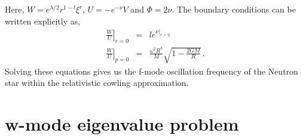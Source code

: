 Here, $W = e^{\lambda/2} r^{1-l} \xi^r$, $U = -e^{-\nu}V$ and $\Phi = 2\nu$.
The boundary conditions can be written explicitly as,
\begin{eqnarray}
	\left.\frac{W}{U}\right|_{r=0}&=&l e^{\nu|_{r=0}} \\
	\left.\frac{W}{U}\right|_{p=0}&=&\frac{\omega^2R^3}{M}\sqrt{1-\frac{2GM}{R}} \,.
\end{eqnarray}
%
Solving these equations gives us the f-mode oscillation frequency of the Neutron star within the relativistic cowling approximation.

\section{w-mode eigenvalue problem}

